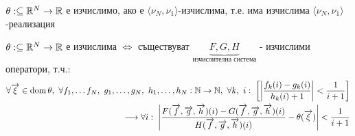 \begin{definition}
    $\theta: \subseteq {\mathbb{R}}^N \to {\mathbb{R}}$ е изчислимо, ако е $\langle \nu_N, \nu_1 \rangle$-изчислима, т.е. има изчислима $\langle \nu_N, \nu_1 \rangle$-реализация
\end{definition}
\begin{proposition}
    $\theta: \subseteq {\mathbb{R}}^N \to {\mathbb{R}}$ е изчислима $\iff$ съществуват $\underbrace{F, G, H}_{\text{изчислителна система}}$ - изчислими оператори, т.ч.:
    \begin{equation}
        \begin{split}
            \forall \overrightarrow\xi \in \dom\theta,\ \forall f_1, \dots f_N,\ g_1, \dots, g_N,\ h_1, \dots, h_N: \N \to \N,\ \forall k,\ i:\; \left[\left| \frac{f_k(i) - g_k(i)}{h_k(i) + 1}\right| < \frac{1}{i+1} \right]\\
            \longrightarrow \forall i:\; \left| \frac{F(\overrightarrow{f}, \overrightarrow{g}, \overrightarrow{h})(i) - G(\overrightarrow{f}, \overrightarrow{g}, \overrightarrow{h})(i)}{H(\overrightarrow{f}, \overrightarrow{g}, \overrightarrow{h})(i)} - \theta(\overrightarrow\xi)\right| < \frac{1}{i+1}
        \end{split}
    \end{equation}
\end{proposition}
